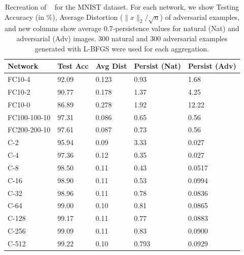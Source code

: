 \begin{table}[ht]
\centering
\caption{Recreation of ~\cite[Table 1]{Szegedy2013} for the MNIST dataset.  For each network, we show Testing Accuracy (in \%), Average Distortion ($\|x\|_2/\sqrt{n}$) of adversarial examples, and new columns show average $0.7$-persistence values for natural (Nat) and adversarial (Adv) images. 300 natural and 300 adversarial examples generated with L-BFGS were used for each aggregation.}
\label{table1}
\begin{tabular}{lllll}
\toprule
Network & Test Acc & Avg Dist & Persist (Nat) & Persist (Adv) \\
\midrule
FC10-4 & 92.09 & 0.123 & 0.93 & 1.68\\
FC10-2 & 90.77 & 0.178 & 1.37 & 4.25\\
FC10-0 & 86.89 & 0.278 & 1.92 & 12.22\\
FC100-100-10 & 97.31 & 0.086 & 0.65 & 0.56 \\
FC200-200-10 & 97.61 & 0.087 & 0.73 & 0.56 \\
\midrule
C-2 & 95.94 & 0.09 & 3.33 & 0.027 \\
C-4 & 97.36 & 0.12 & 0.35 & 0.027 \\
C-8 & 98.50 & 0.11 & 0.43  & 0.0517 \\
C-16 & 98.90 & 0.11 & 0.53 & 0.0994 \\
C-32 & 98.96 & 0.11 & 0.78 & 0.0836 \\
C-64 & 99.00 & 0.10 & 0.81 & 0.0865 \\
C-128 & 99.17 & 0.11 & 0.77 & 0.0883 \\
C-256 & 99.09 & 0.11  & 0.83 & 0.0900 \\
C-512 & 99.22 & 0.10 & 0.793 & 0.0929 \\
\bottomrule
\end{tabular}
\end{table}

